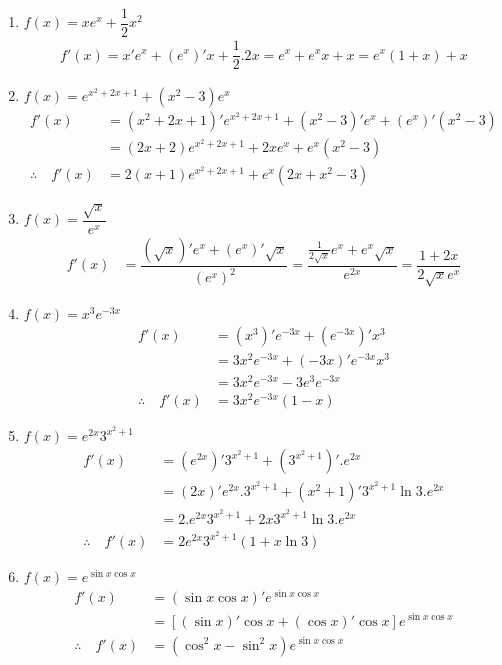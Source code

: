 \documentclass[a4paper,12pt]{article}
\begin{document}
\answer
\begin{enumerate}
	\item $f(x)=xe^x +\dfrac{1}{2}x^2$
	      \begin{align*}
		      f'(x)=x' e^x +(e^x)'x+\dfrac{1}{2}.2x=e^x+e^xx +x=e^x(1+x)+x
	      \end{align*}
	\item $f(x)=e^{x^2+2x+1}+(x^2-3)e^x$
	      \begin{align*}
		      f'(x)                  & =(x^2+2x+1)'e^{x^2+2x+1}+(x^2-3)'e^x+(e^x)'(x^2-3) \\
		                             & =(2x+2)e^{x^2+2x+1}+2xe^x+e^x(x^2-3)               \\
		      \therefore \quad f'(x) & =2(x+1)e^{x^2+2x+1}+e^x(2x+x^2-3)
	      \end{align*}
	\item $f(x)=\dfrac{\sqrt{x}}{e^x}$
	      \begin{align*}
		      f'(x) & =\dfrac{(\sqrt{x})'e^x+(e^x)' \sqrt{x}}{(e^x)^2}=\dfrac{\frac{1}{2\sqrt{x}}e^x+e^x\sqrt{x}}{e^{2x}}=\dfrac{1+2x}{2\sqrt{x}e^x}
	      \end{align*}
	\item $f(x)=x^3 e^{-3x}$
	      \begin{align*}
		      f'(x)                  & =(x^3)'e^{-3x}+(e^{-3x})'x^3   \\
		                             & =3x^2 e^{-3x}+(-3x)'e^{-3x}x^3 \\
		                             & =3x^2e^{-3x}-3e^3e^{-3x}       \\
		      \therefore \quad f'(x) & =3x^2e^{-3x}(1-x)
	      \end{align*}
	\item $f(x)=e^{2x}3^{x^2+1}$
	      \begin{align*}
		      f'(x)                  & =(e^{2x})'3^{x^2+1}+(3^{x^2+1})'.e^{2x}                \\
		                             & =(2x)'e^{2x}.3^{x^2+1}+(x^2+1)'3^{x^2+1}\ln 3 . e^{2x} \\
		                             & =2.e^{2x}3^{x^2+1}+2x3^{x^2+1}\ln 3. e^{2x}            \\
		      \therefore \quad f'(x) & =2e^{2x}3^{x^2+1}(1+x\ln 3)
	      \end{align*}
	\item $f(x)=e^{\sin x\cos x}$
	      \begin{align*}
		      f'(x)                  & =(\sin x\cos x)'e^{\sin x\cos x}                   \\
		                             & =[(\sin x)'\cos x+(\cos x)'\cos x]e^{\sin x\cos x} \\
		      \therefore \quad f'(x) & =(\cos^2 x-\sin^2 x)e^{\sin x\cos x}
	      \end{align*}
\end{enumerate}
\end{document}
